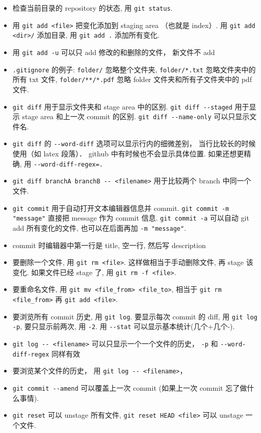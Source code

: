 \begin{itemize}
\item 检查当前目录的 repository 的状态, 用 \verb|git status|. 
\item 用 \verb|git add <file>| 把变化添加到 staging area （也就是 index）. 用 \verb|git add <dir>/| 添加目录, 用 \verb|git add .| 添加所有变化.
\item 用 \verb|git add -u| 可以只 add 修改的和删除的文件， 新文件不 add
\item \verb|.gitignore| 的例子: \verb|folder/| 忽略整个文件夹, \verb|folder/*.txt| 忽略文件夹中的所有 txt 文件, \verb|folder/**/*.pdf| 忽略 folder 文件夹和所有子文件夹中的 pdf 文件.
\item \verb|git diff| 用于显示文件夹和 stage area 中的区别. \verb|git diff --staged| 用于显示 stage area 和上一次 commit 的区别. \verb|git diff --name-only| 可以只显示文件名.
\item \verb|git diff| 的 \verb|--word-diff| 选项可以显示行内的细微差别， 当行比较长的时候使用（如 latex 段落）． github 中有时候也不会显示具体位置. 如果还想更精确, 用 \verb|--word-diff-regex=.|
\item \verb|git diff branchA branchB -- <filename>| 用于比较两个 branch 中同一个文件.
\item \verb|git commit| 用于自动打开文本编辑器信息并 commit. \verb|git commit -m "message"| 直接把 message 作为 commit 信息. \verb|git commit -a| 可以自动 git add 所有变化的文件, 也可以在后面再加 \verb|-m "message"|.
\item commit 时编辑器中第一行是 title, 空一行, 然后写 description
\item 要删除一个文件, 用 \verb|git rm <file>|. 这样做相当于手动删除文件, 再 stage 该变化. 如果文件已经 stage 了, 用 \verb|git rm -f <file>|.
\item 要重命名文件, 用 \verb|git mv <file_from> <file_to>|, 相当于 \verb|git rm <file_from>| 再 \verb|git add <file>|.
\item 要浏览所有 commit 历史, 用 \verb|git log|. 要显示每次 commit 的 diff, 用 \verb|git log -p|, 要只显示前两次, 用 \verb|-2|. 用 \verb|--stat| 可以显示基本统计(几个+几个-).
\item \verb|git log -- <filename>| 可以只显示一个一个文件的历史， \verb|-p| 和 \verb|--word-diff-regex| 同样有效
\item 要浏览某个文件的历史， 用 \verb|git log -- <filename>|， 
\item \verb|git commit --amend| 可以覆盖上一次 commit (如果上一次 commit 忘了做什么事情).
\item \verb|git reset| 可以 unstage 所有文件, \verb|git reset HEAD <file>| 可以 unstage 一个文件.

\end{itemize}
